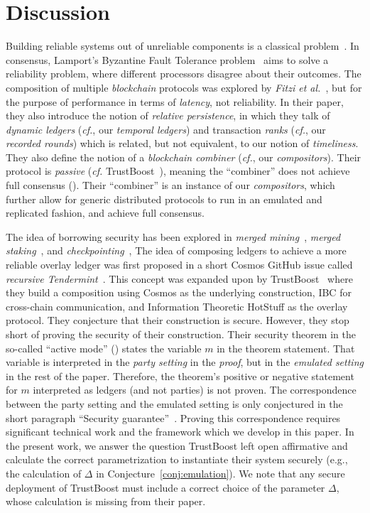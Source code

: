 \section{Discussion}

Building reliable systems out of unreliable components
is a classical problem~\cite{von1956probabilistic,moore1956reliable}.
In consensus, Lamport's Byzantine Fault Tolerance problem~\cite{shostak1982byzantine}
aims to solve a reliability problem, where different processors disagree about their
outcomes. The composition of multiple \emph{blockchain} protocols was explored by
\emph{Fitzi et al.}~\cite{combiners}, but for the purpose of performance in terms of
\emph{latency}, not reliability. In their paper, they also introduce the notion of
\emph{relative persistence}, in which they talk of \emph{dynamic ledgers} (\emph{cf.}, our
\emph{temporal ledgers}) and transaction \emph{ranks} (\emph{cf.}, our \emph{recorded rounds})
which is related, but not equivalent, to our notion of \emph{timeliness}.
They also define the notion of a \emph{blockchain combiner} (\emph{cf.}, our \emph{compositors}).
Their protocol is \emph{passive} (\emph{cf.} TrustBoost~\cite{trustboost}),
meaning the ``combiner'' does not achieve full consensus (\cite[Section 5]{combiners}).
Their ``combiner'' is an instance of our \emph{compositors}, which
further allow for generic distributed protocols to run in an emulated and
replicated fashion, and achieve full consensus.

The idea of borrowing security has been explored in \emph{merged mining}~\cite{namecoin},
\emph{merged staking}~\cite{pos-sidechains}, and
\emph{checkpointing}~\cite{karakostas2021securing},
The idea of composing ledgers to achieve a more reliable overlay ledger
was first proposed in a short Cosmos GitHub issue called
\emph{recursive Tendermint}~\cite{recursive-tendermint}.
This concept was expanded upon by TrustBoost~\cite{trustboost}
where they build a composition using Cosmos as the underlying
construction, IBC for cross-chain communication, and Information Theoretic
HotStuff as the overlay protocol. They conjecture that their construction
is secure. However, they stop short of proving the security of their construction.
Their security theorem in the so-called ``active mode'' (\cite[Theorem 2]{trustboost})
states the variable $m$ in the theorem statement. That variable is
interpreted in the \emph{party setting} in the \emph{proof}, but in the \emph{emulated setting}
in the rest of the paper. Therefore, the theorem's positive or negative statement
for $m$ interpreted as ledgers (and not parties) is not proven.
The correspondence between the party setting and the emulated setting is
only conjectured in the short paragraph ``Security guarantee''~\cite[Section 4.1]{trustboost}.
Proving this correspondence requires significant technical work and the framework
which we develop in this paper.
In the present work, we
answer the question TrustBoost left open affirmative and calculate the correct
parametrization to instantiate their system securely (e.g., the calculation
of $\Delta$ in Conjecture~\ref{conj:emulation}). We note that any secure
deployment of TrustBoost must include a correct choice of the parameter $\Delta$,
whose calculation is missing from their paper.

